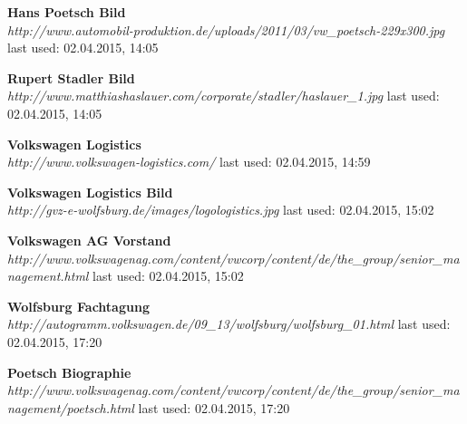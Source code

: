\documentclass[12pt]{article}
\begin{document}
\begin{thebibliography}{56}
\textbf{Hans Poetsch Bild} \\
\textit{
	http://www.automobil-produktion.de/uploads/2011/03/vw\_poetsch-229x300.jpg
}
\newline last used: 02.04.2015, 14:05

\textbf{Rupert Stadler Bild} \\
\textit{
	http://www.matthiashaslauer.com/corporate/stadler/haslauer\_1.jpg
}
\newline last used: 02.04.2015, 14:05

\textbf{Volkswagen Logistics} \\
\textit{
	http://www.volkswagen-logistics.com/
}
\newline last used: 02.04.2015, 14:59

\textbf{Volkswagen Logistics Bild} \\
\textit{
	http://gvz-e-wolfsburg.de/images/logologistics.jpg
}
\newline last used: 02.04.2015, 15:02

\textbf{Volkswagen AG Vorstand} \\
\textit{
	http://www.volkswagenag.com/content/vwcorp/content/de/the\_group/senior\_management.html
}
\newline last used: 02.04.2015, 15:02

\textbf{Wolfsburg Fachtagung} \\
\textit{
	http://autogramm.volkswagen.de/09\_13/wolfsburg/wolfsburg\_01.html
}
\newline last used: 02.04.2015, 17:20

\textbf{Poetsch Biographie} \\
\textit{
	http://www.volkswagenag.com/content/vwcorp/content/de/the\_group/senior\_management/poetsch.html
}
\newline last used: 02.04.2015, 17:20


\end{thebibliography}
\end{document}
